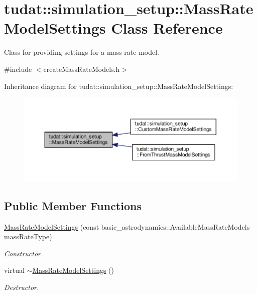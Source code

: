 \hypertarget{classtudat_1_1simulation__setup_1_1MassRateModelSettings}{}\section{tudat\+:\+:simulation\+\_\+setup\+:\+:Mass\+Rate\+Model\+Settings Class Reference}
\label{classtudat_1_1simulation__setup_1_1MassRateModelSettings}


Class for providing settings for a mass rate model.  




{\ttfamily \#include $<$create\+Mass\+Rate\+Models.\+h$>$}



Inheritance diagram for tudat\+:\+:simulation\+\_\+setup\+:\+:Mass\+Rate\+Model\+Settings\+:
\nopagebreak
\begin{figure}[H]
\begin{center}
\leavevmode
\includegraphics[width=350pt]{classtudat_1_1simulation__setup_1_1MassRateModelSettings__inherit__graph}
\end{center}
\end{figure}
\subsection*{Public Member Functions}
\begin{DoxyCompactItemize}
\item 
\hyperlink{classtudat_1_1simulation__setup_1_1MassRateModelSettings_a49e887fe50d6c9ce9cac056d99f8de73}{Mass\+Rate\+Model\+Settings} (const basic\+\_\+astrodynamics\+::\+Available\+Mass\+Rate\+Models mass\+Rate\+Type)
\begin{DoxyCompactList}\small\item\em Constructor. \end{DoxyCompactList}\item 
virtual \hyperlink{classtudat_1_1simulation__setup_1_1MassRateModelSettings_ae135352ebe4e750ed2cf36e3a23913db}{$\sim$\+Mass\+Rate\+Model\+Settings} ()\hypertarget{classtudat_1_1simulation__setup_1_1MassRateModelSettings_ae135352ebe4e750ed2cf36e3a23913db}{}\label{classtudat_1_1simulation__setup_1_1MassRateModelSettings_ae135352ebe4e750ed2cf36e3a23913db}

\begin{DoxyCompactList}\small\item\em Destructor. \end{DoxyCompactList}\end{DoxyCompactItemize}
